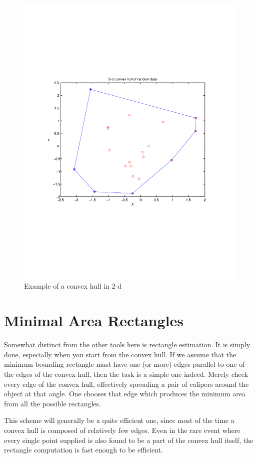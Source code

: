 \documentclass[a4paper,11pt]{article}
\begin{document}
\begin{figure}
\centering
    \includegraphics[width=5in]{convhull.pdf}
        \caption{Example of a convex hull in 2-d}
\end{figure}

\bigskip

\section{Minimal Area Rectangles}

Somewhat distinct from the other tools here is rectangle estimation. It is simply done,
especially when you start from the convex hull. If we assume that the minimum bounding
rectangle must have one (or more) edges parallel to one of the edges of the convex hull,
then the task is a simple one indeed. Merely check every edge of the convex hull,
effectively spreading a pair of calipers around the object at that angle. One chooses that
edge which produces the minimum area from all the possible rectangles.

This scheme will generally be a quite efficient one, since most of the time a convex hull 
is composed of relatively few edges. Even in the rare event where every single point
supplied is also found to be a part of the convex hull itself, the rectangle computation is
fast enough to be efficient.
\end{document}
